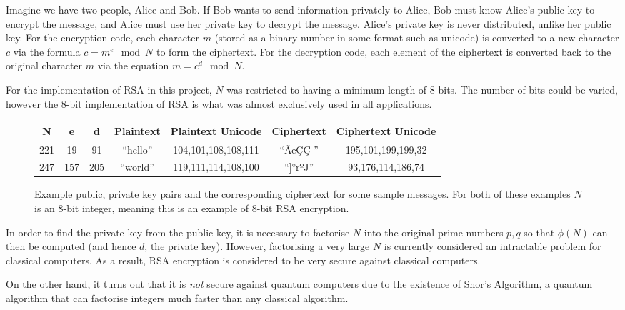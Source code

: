 \documentclass{article}[11pt]
\begin{document}
Imagine we have two people, Alice and Bob. If Bob wants to send information privately to Alice, Bob must know Alice's public key to encrypt the message, and Alice must use her private key to decrypt the message. Alice’s private key is never distributed, unlike her public key. For the encryption code, each character $m$ (stored as a binary number in some format such as unicode) is converted to a new character $c$ via the formula $c=m^e\mod N$ to form the ciphertext.\cite{RSA} For the decryption code, each element of the ciphertext is converted back to the original character $m$ via the equation $m=c^d\mod N$.\cite{RSA}

For the implementation of RSA in this project, $N$ was restricted to having a minimum length of 8 bits. The number of bits could be varied, however the 8-bit implementation of RSA is what was almost exclusively used in all applications.
\begin{figure}[H]
    \centering
    \begin{tabular}{||c|c|c|c|c|c|c||}
        \hline
        N & e & d & Plaintext & Plaintext Unicode & Ciphertext & Ciphertext Unicode \\
        \hline
        221 & 19 & 91 & ``hello'' & 104,101,108,108,111 & ``ÃeÇÇ '' & 195,101,199,199,32 \\
        \hline
        247 & 157 & 205 & ``world'' & 119,111,114,108,100 & ``]°rºJ'' & 93,176,114,186,74 \\
        \hline
    \end{tabular}
    \caption{Example public, private key pairs and the corresponding ciphertext for some sample messages. For both of these examples $N$ is an 8-bit integer, meaning this is an example of 8-bit RSA encryption.}
    \label{fig:RSA_example_table}
\end{figure}

In order to find the private key from the public key, it is necessary to factorise $N$ into the original prime numbers $p,q$ so that $\phi(N)$ can then be computed (and hence $d$, the private key).\cite{RSA} However, factorising a very large $N$ is currently considered an intractable problem for classical computers.\cite{nielsenChuang,RSAattack} As a result, RSA encryption is considered to be very secure against classical computers. 

On the other hand, it turns out that it is \emph{not} secure against quantum computers due to the existence of Shor's Algorithm, a quantum algorithm that can factorise integers much faster than any classical algorithm.
\end{document}
